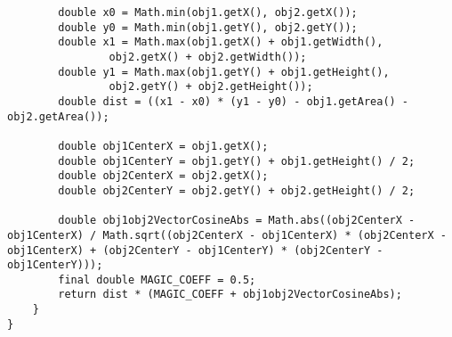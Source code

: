 \begin{appendices}
\begin{lstlisting}
        double x0 = Math.min(obj1.getX(), obj2.getX());
        double y0 = Math.min(obj1.getY(), obj2.getY());
        double x1 = Math.max(obj1.getX() + obj1.getWidth(),
                obj2.getX() + obj2.getWidth());
        double y1 = Math.max(obj1.getY() + obj1.getHeight(),
                obj2.getY() + obj2.getHeight());
        double dist = ((x1 - x0) * (y1 - y0) - obj1.getArea() - obj2.getArea());

        double obj1CenterX = obj1.getX();
        double obj1CenterY = obj1.getY() + obj1.getHeight() / 2;
        double obj2CenterX = obj2.getX();
        double obj2CenterY = obj2.getY() + obj2.getHeight() / 2;

        double obj1obj2VectorCosineAbs = Math.abs((obj2CenterX - obj1CenterX) / Math.sqrt((obj2CenterX - obj1CenterX) * (obj2CenterX - obj1CenterX) + (obj2CenterY - obj1CenterY) * (obj2CenterY - obj1CenterY)));
        final double MAGIC_COEFF = 0.5;
        return dist * (MAGIC_COEFF + obj1obj2VectorCosineAbs);
    }
}
\end{lstlisting}

\end{appendices}